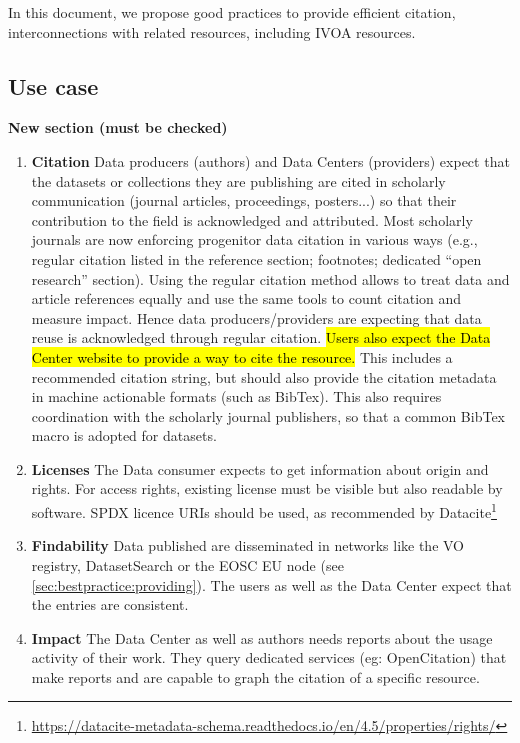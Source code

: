 \documentclass[11pt,a4paper]{ivoa}
\begin{document}
In this document, we propose good practices to provide efficient citation, 
interconnections with related resources, including IVOA resources.


\subsection{Use case}
\textbf{\color{red}New section (must be checked)}

\begin{enumerate}
	\item \textbf{Citation} Data producers (authors) and Data Centers 
	(providers) expect that the datasets or collections they are publishing are 
 	cited in scholarly communication (journal articles, proceedings, posters...) 
  	so that their contribution to the field is acknowledged and attributed. Most 
   	scholarly journals are now enforcing progenitor data citation in various ways 
    	(e.g., regular citation listed in the reference section; footnotes; dedicated 
     	``open research'' section). Using the regular citation method allows to treat 
      	data and article references equally and use the same tools to count citation 
        and measure impact. Hence data producers/providers are expecting that data
	reuse is acknowledged through regular citation. 
	\hl{Users also expect the Data Center website to provide a way to cite the resource.}
 	This includes a recommended citation string, but should also provide the 
  	citation metadata in machine actionable formats (such as BibTex). This also 
   	requires coordination with the scholarly journal publishers, so that a common
	BibTex macro is adopted for datasets.
	
	\item \textbf{Licenses} The Data consumer expects to get information about 
 	origin and rights. For access rights, existing license must be visible but 
  	also readable by software. SPDX licence URIs should be used, as recommended 
   	by Datacite\footnote{\url{https://datacite-metadata-schema.readthedocs.io/en/4.5/properties/rights/}}
	
	\item \textbf{Findability} Data published are disseminated in networks like the VO registry, 
 	DatasetSearch or the EOSC EU node (see \ref{sec:bestpractice:providing}). 
  	The users as well as the Data Center expect that the entries are consistent.
	
	\item \textbf{Impact} The Data Center as well as authors needs reports about the usage activity of their work. They query dedicated services (eg: OpenCitation) that make reports and are capable to graph the citation of a specific resource.
	

\end{enumerate}
\end{document}
